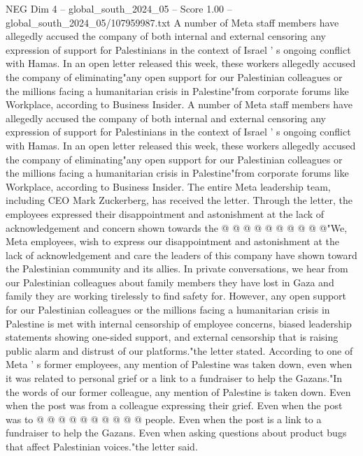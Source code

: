 \begin{textsample}{NEG Dim 4 – global\_south\_2024\_05 – Score 1.00 – global\_south\_2024\_05/107959987.txt}  \label{ex:f4_neg_257}
A number of Meta staff members have allegedly accused the company of both internal and external censoring any expression of support for Palestinians in the context of Israel ' s ongoing conflict with Hamas.
In an open letter released this week, these workers allegedly accused the company of eliminating"any open support for our Palestinian colleagues or the millions facing a humanitarian crisis in Palestine"from corporate forums like Workplace, according to Business Insider.
A number of Meta staff members have allegedly accused the company of both internal and external censoring any expression of support for Palestinians in the context of Israel ' s ongoing conflict with Hamas.
In an open letter released this week, these workers allegedly accused the company of eliminating"any open support for our Palestinian colleagues or the millions facing a humanitarian crisis in Palestine"from corporate forums like Workplace, according to Business Insider.
The entire Meta leadership team, including CEO Mark Zuckerberg, has received the letter.
Through the letter, the employees expressed their disappointment and astonishment at the lack of acknowledgement and concern shown towards the @ @ @ @ @ @ @ @ @ @"We, Meta employees, wish to express our disappointment and astonishment at the lack of acknowledgement and care the leaders of this company have shown toward the Palestinian community and its allies.
In private conversations, we hear from our Palestinian colleagues about family members they have lost in Gaza and family they are working tirelessly to find safety for.
However, any open support for our Palestinian colleagues or the millions facing a humanitarian crisis in Palestine is met with internal censorship of employee concerns, biased leadership statements showing one-sided support, and external censorship that is raising public alarm and distrust of our platforms."the letter stated.
According to one of Meta ' s former employees, any mention of Palestine was taken down, even when it was related to personal grief or a link to a fundraiser to help the Gazans."In the words of our former colleague, any mention of Palestine is taken down.
Even when the post was from a colleague expressing their grief.
Even when the post was to @ @ @ @ @ @ @ @ @ @ people.
Even when the post is a link to a fundraiser to help the Gazans.
Even when asking questions about product bugs that affect Palestinian voices."the letter said.

\end{textsample}
